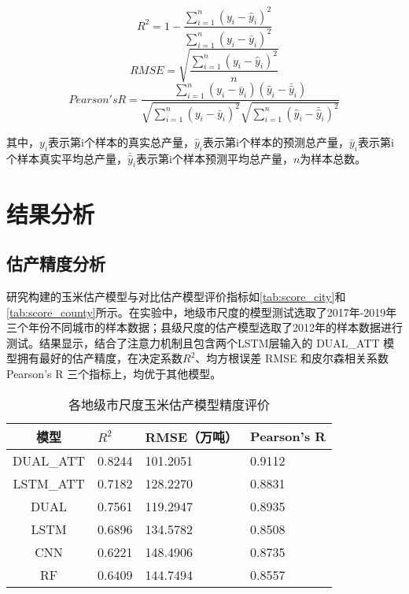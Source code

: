 \begin{equation}
  \label{equ:R2}
  R^2=1-\frac{\sum_{i=1}^n (y_i-\hat{y}_i)^2}{\sum_{i=1}^n (y_i-\bar{y}_i)^2}
\end{equation}
\begin{equation}
  \label{equ:RMSE}
  RMSE=\sqrt{\frac{\sum_{i=1}^n (y_i-\hat{y}_i)^2}{n}}
\end{equation}
\begin{equation}
  \label{equ:Pearson}
  Pearson's R=\frac{\sum_{i=1}^n (y_i-\bar{y}_i)(\hat{y}_i-\bar{\hat{y}}_i)}{\sqrt{\sum_{i=1}^n (y_i-\bar{y}_i)^2}\sqrt{\sum_{i=1}^n (\hat{y}_i-\bar{\hat{y}}_i)^2}}
\end{equation}

\par 其中，$y_i$表示第i个样本的真实总产量，$\hat{y}_i$表示第i个样本的预测总产量，$\bar{y}_i$表示第i个样本真实平均总产量，$\bar{\hat{y}}_i$表示第i个样本预测平均总产量，$n$为样本总数。


\section{结果分析}
\subsection{估产精度分析}
\par 研究构建的玉米估产模型与对比估产模型评价指标如\autoref{tab:score_city}和\autoref{tab:score_county}所示。在实验中，地级市尺度的模型测试选取了2017年-2019年三个年份不同城市的样本数据；县级尺度的估产模型选取了2012年的样本数据进行测试。结果显示，结合了注意力机制且包含两个LSTM层输入的 DUAL\_ATT 模型拥有最好的估产精度，在决定系数$R^2$、均方根误差 RMSE 和皮尔森相关系数 Pearson's R 三个指标上，均优于其他模型。

\begin{table}
  \centering
  \caption{各地级市尺度玉米估产模型精度评价}
  \label{tab:score_city}
  \begin{tabularx}{\linewidth}{cX<{\centering}X<{\centering}X<{\centering}}
      \toprule
      模型 & $R^2$ & RMSE（万吨） & Pearson's R \\
      \midrule
      DUAL\_ATT & 0.8244 & 101.2051 & 0.9112 \\
      LSTM\_ATT & 0.7182 & 128.2270 & 0.8831 \\
      DUAL & 0.7561 & 119.2947 & 0.8935 \\
      LSTM & 0.6896 & 134.5782 & 0.8508 \\
      CNN & 0.6221 & 148.4906 & 0.8735 \\
      RF & 0.6409 & 144.7494 & 0.8557 \\ 
      \bottomrule
  \end{tabularx}
\end{table}

